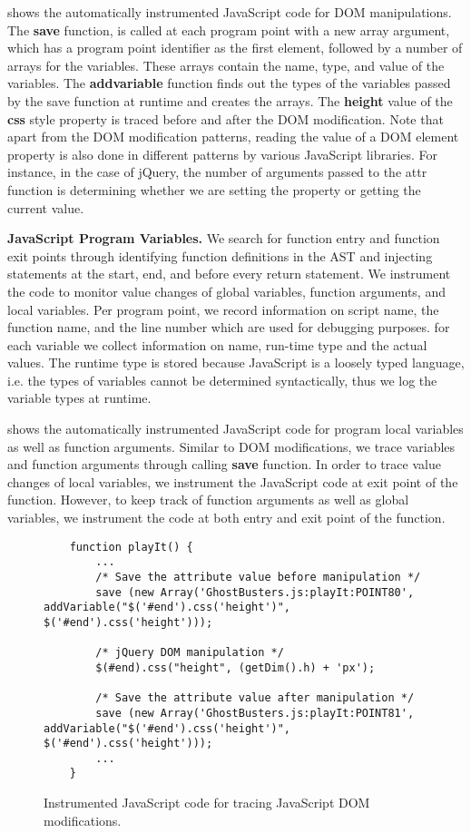  shows the automatically instrumented JavaScript code for DOM manipulations. The {\bf save} function,
is called at each program point with a new array argument, which has a program point identifier as the first element, 
followed by a number of arrays for the variables. These arrays contain the name, type, and value of the variables. 
The {\bf addvariable} function finds out the types of the variables passed by the save function at runtime and creates 
the arrays. The {\bf height} value of the {\bf css} style property is traced before and after the DOM modification. Note that apart
from the DOM modification patterns, reading the value of a DOM element property is also done in different patterns by
various JavaScript libraries. For instance, in the case of jQuery, the number of arguments passed to the attr function 
is determining whether we are setting the property or getting the current value.

{\bf JavaScript Program Variables.} We search for function entry and function exit points through identifying function
definitions in the AST and injecting statements at the start, end, and before every return statement. We instrument the
code to monitor value changes of global variables, function arguments, and local variables.
Per program point, we record information on script name, the function name, and the line number which are used for debugging
purposes. for each variable we collect information on name, run-time type and the actual values. The runtime type is stored
because JavaScript is a loosely typed language, i.e. the types of variables cannot be determined syntactically, thus
we log the variable types at runtime.

 shows the automatically instrumented JavaScript code for program local variables as well as function arguments.
Similar to DOM modifications, we trace variables and function arguments through calling {\bf save} function. 
In order to trace value changes of local variables, we instrument the JavaScript code at exit point of the function. 
However, to keep track of function arguments as well as global variables, we instrument the code at both entry and exit point of the function.  



\begin{figure}
\medskip
\begin{lstlisting}
	function playIt() {
		...	
		/* Save the attribute value before manipulation */
		save (new Array('GhostBusters.js:playIt:POINT80', addVariable("$('#end').css('height')", $('#end').css('height')));
	
		/* jQuery DOM manipulation */
		$(#end).css("height", (getDim().h) + 'px');
	
		/* Save the attribute value after manipulation */
		save (new Array('GhostBusters.js:playIt:POINT81', addVariable("$('#end').css('height')", $('#end').css('height')));
		...
	}	

\end{lstlisting}
\caption{Instrumented JavaScript code for tracing JavaScript DOM modifications.}
\label{Fig:example_dom_instrumentation}
\end{figure}




